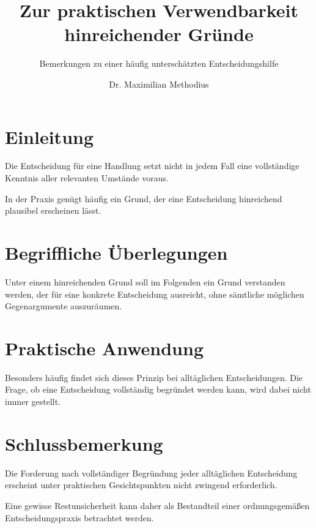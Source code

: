 \documentclass{praxisplaus}
\title{Zur praktischen Verwendbarkeit hinreichender Gründe}
\subtitle{Bemerkungen zu einer häufig unterschätzten Entscheidungshilfe}
\author{Dr. Maximilian Methodius}
\begin{document}
\section{Einleitung}

Die Entscheidung für eine Handlung setzt nicht in jedem Fall eine
vollständige Kenntnis aller relevanten Umstände voraus.

In der Praxis genügt häufig ein Grund, der eine Entscheidung hinreichend
plausibel erscheinen lässt.

\section{Begriffliche Überlegungen}

Unter einem hinreichenden Grund soll im Folgenden ein Grund verstanden
werden, der für eine konkrete Entscheidung ausreicht, ohne sämtliche
möglichen Gegenargumente auszuräumen.

\section{Praktische Anwendung}

Besonders häufig findet sich dieses Prinzip bei alltäglichen Entscheidungen.
Die Frage, ob eine Entscheidung vollständig begründet werden kann, wird
dabei nicht immer gestellt.

\section{Schlussbemerkung}

Die Forderung nach vollständiger Begründung jeder alltäglichen Entscheidung
erscheint unter praktischen Gesichtspunkten nicht zwingend erforderlich.

Eine gewisse Restunsicherheit kann daher als Bestandteil einer
ordnungsgemäßen Entscheidungspraxis betrachtet werden.
\end{document}
